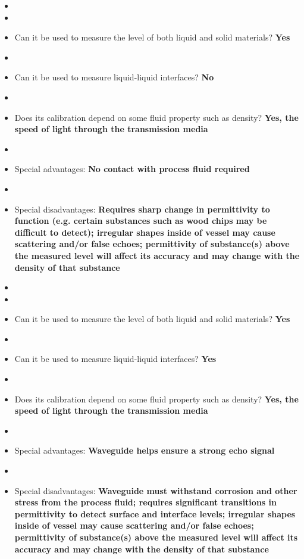 \begin{itemize}
\goodbreak
\item{} 
\item\item{} Can it be used to measure the level of both liquid and solid materials? {\bf Yes}
\item\item{} Can it be used to measure liquid-liquid interfaces? {\bf No}
\item\item{} Does its calibration depend on some fluid property such as density? {\bf Yes, the speed of light through the transmission media}
\item\item{} Special advantages: {\bf No contact with process fluid required}
\item\item{} Special disadvantages: {\bf Requires sharp change in permittivity to function (e.g. certain substances such as wood chips may be difficult to detect); irregular shapes inside of vessel may cause scattering and/or false echoes; permittivity of substance(s) above the measured level will affect its accuracy and may change with the density of that substance}
\end{itemize}

\vskip 10pt

\begin{itemize}
\goodbreak
\item{} 
\item\item{} Can it be used to measure the level of both liquid and solid materials? {\bf Yes}
\item\item{} Can it be used to measure liquid-liquid interfaces? {\bf Yes}
\item\item{} Does its calibration depend on some fluid property such as density? {\bf Yes, the speed of light through the transmission media}
\item\item{} Special advantages: {\bf Waveguide helps ensure a strong echo signal}
\item\item{} Special disadvantages: {\bf Waveguide must withstand corrosion and other stress from the process fluid; requires significant transitions in permittivity to detect surface and interface levels; irregular shapes inside of vessel may cause scattering and/or false echoes; permittivity of substance(s) above the measured level will affect its accuracy and may change with the density of that substance}
\end{itemize}

